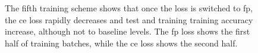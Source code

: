 \begin{figure}[p]
    \caption[The results of the fifth training scheme]{The fifth training scheme shows that once the loss is switched to \gls{fp}, the \gls{ce} loss rapidly decreases and test and training training accuracy increase, although not to baseline levels. The \gls{fp} loss shows the first half of training batches, while the \gls{ce} loss shows the second half.}
    \label{fig:training_scheme_5}
\end{figure}

